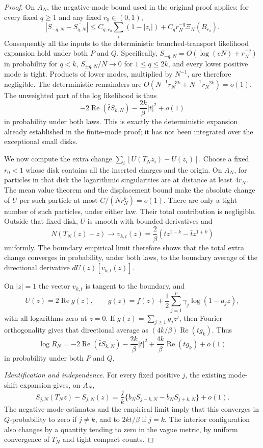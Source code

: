 \documentclass[11pt,a4paper]{article}
\numberwithin{equation}{section}
\theoremstyle{definition}
\theoremstyle{remark}
\begin{document}
\begin{proof}
On $A_N$, the negative-mode bound used in the original proof applies:
for every fixed $q\geq1$ and any fixed $r_0\in(0,1)$,
\[
 |S_{-q,N}-\overline{S_{q,N}}|
 \leq C_{q,r_0}\sum_i(1-|z_i|)
        +C_qr_N^{-q}\Xi_N(B_{r_0}).
\]
Consequently all the inputs to the deterministic branched-transport
likelihood expansion hold under both $P$ and $Q$. Specifically,
$S_{-q,N}=O(\log(eN)+r_N^{-q})$ in probability for $q<k$,
$S_{\pm q,N}/N\to0$ for $1\leq q\leq2k$, and every lower positive mode
is tight. Products of lower modes, multiplied by $N^{-1}$, are therefore
negligible. The deterministic remainders are
$O(N^{-1}r_N^{-3k}+N^{-1}r_N^{-2k})=o(1)$.
The unweighted part of the log likelihood is thus
\[
 -2\operatorname{Re}(\bar t S_{k,N})
             -\frac{2k}{\beta}|t|^2+o(1)
\]
in probability under both laws. This is exactly the deterministic
expansion already established in the finite-mode proof; it has not been
integrated over the exceptional small disks.

We now compute the extra change $\sum_i[U(T_Nz_i)-U(z_i)]$.
Choose a fixed $r_0<1$ whose disk contains all the inserted charges and
the origin. On $A_N$, for particles in that disk the logarithmic
singularities are at distance at least $4r_N$. The mean value theorem
and the displacement bound make the absolute change of $U$ per such
particle at most $C/(Nr_N^k)=o(1)$. There are only a tight number of
such particles, under either law. Their total contribution is negligible.
Outside that fixed disk, $U$ is smooth with bounded derivatives and
\[
 N(T_N(z)-z)\longrightarrow
 v_{k,t}(z)=\frac2\beta(tz^{1-k}-\bar t z^{1+k})
\]
uniformly. The boundary empirical limit therefore shows that the total
extra change converges in probability, under both laws, to the boundary
average of the directional derivative $dU(z)[v_{k,t}(z)]$.

On $|z|=1$ the vector $v_{k,t}$ is tangent to the boundary, and
\[
 U(z)=2\operatorname{Re}g(z),\qquad
 g(z)=f(z)+\frac12\sum_{j=1}^p\gamma_j\log(1-\overline{a_j}z),
\]
with all logarithms zero at $z=0$. If $g(z)=\sum_{j\geq1}g_jz^j$,
then Fourier orthogonality gives that directional average as
$(4k/\beta)\operatorname{Re}(t g_k)$. Thus
\begin{equation}\label{eq:palm-screening-likelihood}
 \log R_N=-2\operatorname{Re}(\bar tS_{k,N})
       -\frac{2k}{\beta}|t|^2
       +\frac{4k}{\beta}\operatorname{Re}(t g_k)+o(1)
\end{equation}
in probability under both $P$ and $Q$.

\emph{Identification and independence.}
For every fixed positive $j$, the existing mode-shift expansion gives,
on $A_N$,
\[
 S_{j,N}(T_Nz)-S_{j,N}(z)
 =\frac jk\{b_NS_{j-k,N}-\overline b_NS_{j+k,N}\}+o(1).
\]
The negative-mode estimates and the empirical limit imply that this
converges in $Q$-probability to zero if $j\ne k$, and to $2kt/\beta$
if $j=k$. The interior configuration also changes by a quantity tending
to zero in the vague metric, by uniform convergence of $T_N$ and tight
compact counts.


\end{proof}
\end{document}
